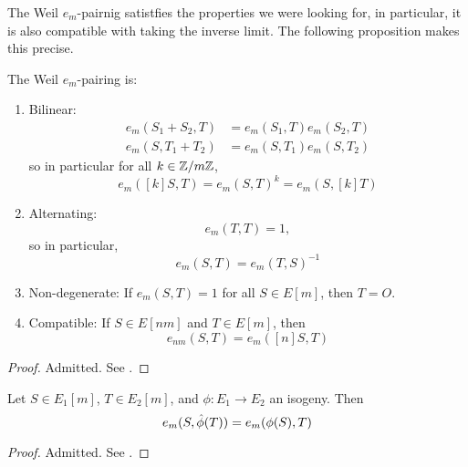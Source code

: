 The Weil $e_m$-pairnig satistfies the properties we were looking for,
in particular, it is also compatible with taking the inverse limit.
The following proposition makes this precise.

\begin{proposition}
	\label{prop:pairing-properties}
	The Weil $e_m$-pairing is:
	\begin{enumerate}[itemsep=0em, label=(\alph*)]
		\item Bilinear:
			\begin{align*}
				e_m(S_1 + S_2, T) &= e_m(S_1, T)e_m(S_2, T)\\
				e_m(S, T_1 + T_2) &= e_m(S, T_1)e_m(S, T_2)
			\end{align*}
			so in particular for all $k \in \mathbb{Z}/m\mathbb{Z}$,
			\begin{equation*}
				e_m([k]S, T) = e_m(S, T)^k = e_m(S, [k]T)
			\end{equation*}
		\item Alternating:
			\begin{equation*}
				e_m(T, T) = 1,
			\end{equation*}
			so in particular,
			\begin{equation*}
				e_m(S, T) = e_m(T, S)^{-1}
			\end{equation*}
		\item Non-degenerate:
			If $e_m(S, T) = 1$ for all $S \in E[m]$, then $T = O$.
		\item Compatible:
			If $S \in E[nm]$ and $T \in E[m]$, then
			\begin{equation*}
				e_{nm}(S, T) = e_m([n]S, T)
			\end{equation*}
	\end{enumerate}
\end{proposition}

\begin{proof}
	Admitted. See \cite[III.8.1]{silverman}.
\end{proof}

\begin{proposition}
	Let $S \in E_1[m]$, $T \in E_2[m]$, and $\phi: E_1 \to E_2$
	an isogeny. Then
	\begin{equation*}
		e_m(S, \Hat\phi(T)) = e_m(\phi(S), T)
	\end{equation*}
\end{proposition}
\begin{proof}
	Admitted. See \cite[III.8.2]{silverman}.
\end{proof}

